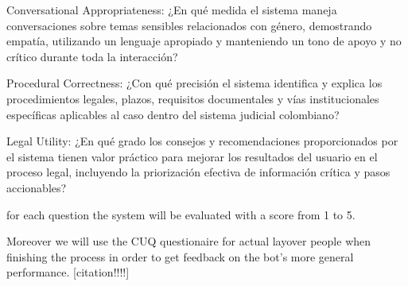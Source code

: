 Conversational Appropriateness:
¿En qué medida el sistema maneja conversaciones sobre temas sensibles relacionados con género, demostrando empatía, utilizando un lenguaje apropiado y manteniendo un tono de apoyo y no crítico durante toda la interacción?

Procedural Correctness:
¿Con qué precisión el sistema identifica y explica los procedimientos legales, plazos, requisitos documentales y vías institucionales específicas aplicables al caso dentro del sistema judicial colombiano?

Legal Utility:
¿En qué grado los consejos y recomendaciones proporcionados por el sistema tienen valor práctico para mejorar los resultados del usuario en el proceso legal, incluyendo la priorización efectiva de información crítica y pasos accionables?

for each question the system will be evaluated with a score from 1 to 5.



Moreover we will use the CUQ questionaire for actual layover people
when finishing the process in order to get feedback on the 
bot's more general performance. [citation!!!!]
